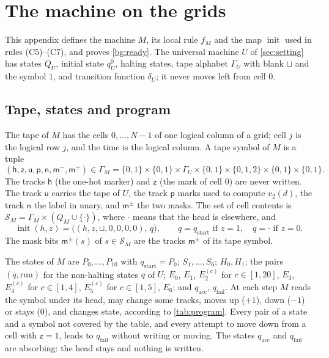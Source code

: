 \section{The machine on the grids}\label{app:machine}

This appendix defines the machine $M$, its local rule $f_M$ and the map $\operatorname{init}$ used in rules (C5)--(C7), and proves \cref{bg:ready}. The universal machine $U$ of \cref{sec:setting} has states $Q_U$, initial state $q^0_U$, halting states, tape alphabet $\Gamma_U$ with blank $\sqcup$ and the symbol $1$, and transition function $\delta_U$; it never moves left from cell $0$.

\subsection{Tape, states and program}

The tape of $M$ has the cells $0,\dots,N-1$ of one logical column of a grid; cell $j$ is the logical row $j$, and the time is the logical column. A tape symbol of $M$ is a tuple
\[
(\mathsf h,\mathsf z,\mathsf u,\mathsf p,\mathsf n,\mathsf m^-,\mathsf m^+)\in\Gamma_M=\{0,1\}\times\{0,1\}\times\Gamma_U\times\{0,1\}\times\{0,1,2\}\times\{0,1\}\times\{0,1\}.
\]
The tracks $\mathsf h$ (the one-hot marker) and $\mathsf z$ (the mark of cell $0$) are never written. The track $\mathsf u$ carries the tape of $U$, the track $\mathsf p$ marks used to compute $v_2(d)$, the track $\mathsf n$ the label in unary, and $\mathsf m^\pm$ the two masks. The set of cell contents is $\mathcal S_M=\Gamma_M\times(Q_M\cup\{\cdot\})$, where $\cdot$ means that the head is elsewhere, and
\[
\operatorname{init}(h,z)=\bigl((h,z,\sqcup,0,0,0,0),\,q\bigr),\qquad q=q_{\mathrm{start}}\text{ if }z=1,\quad q=\cdot\text{ if }z=0 .
\]
The mask bits $\mathsf m^\pm(s)$ of $s\in\mathcal S_M$ are the tracks $\mathsf m^\pm$ of its tape symbol.

The states of $M$ are $P_0,\dots,P_{10}$ with $q_{\mathrm{start}}=P_0$; $S_1,\dots,S_6$; $H_0,H_1$; the pairs $(q,\mathrm{run})$ for the non-halting states $q$ of $U$; $E_0$, $E_1$, $E_2^{(c)}$ for $c\in[1,20]$, $E_3$, $E_4^{(c)}$ for $c\in[1,4]$, $E_5^{(c)}$ for $c\in[1,5]$, $E_6$; and $q_{\mathrm{acc}}$, $q_{\mathrm{fail}}$. At each step $M$ reads the symbol under its head, may change some tracks, moves up ($+1$), down ($-1$) or stays ($0$), and changes state, according to \cref{tab:program}. Every pair of a state and a symbol not covered by the table, and every attempt to move down from a cell with $\mathsf z=1$, leads to $q_{\mathrm{fail}}$ without writing or moving. The states $q_{\mathrm{acc}}$ and $q_{\mathrm{fail}}$ are absorbing: the head stays and nothing is written.

